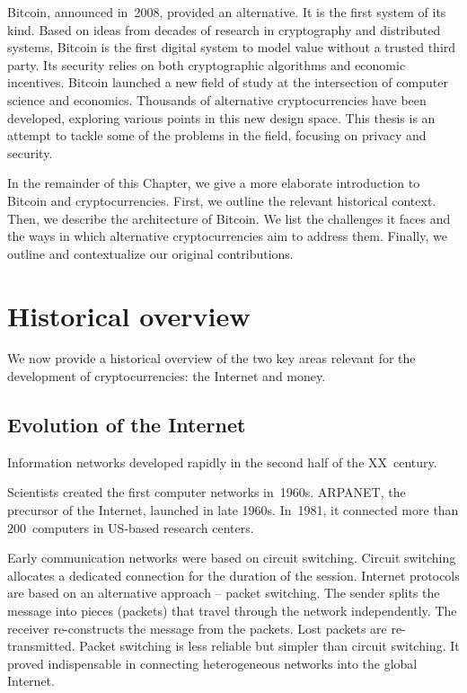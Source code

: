 Bitcoin, announced in~2008, provided an alternative.
It is the first system of its kind.
Based on ideas from decades of research in cryptography and distributed systems, Bitcoin is the first digital system to model value without a trusted third party.
Its security relies on both cryptographic algorithms and economic incentives.
Bitcoin launched a new field of study at the intersection of computer science and economics.
Thousands of alternative cryptocurrencies have been developed, exploring various points in this new design space.
This thesis is an attempt to tackle some of the problems in the field, focusing on privacy and security.

In the remainder of this Chapter, we give a more elaborate introduction to Bitcoin and cryptocurrencies.
First, we outline the relevant historical context.
Then, we describe the architecture of Bitcoin.
We list the challenges it faces and the ways in which alternative cryptocurrencies aim to address them.
Finally, we outline and contextualize our original contributions.


\section{Historical overview}

We now provide a historical overview of the two key areas relevant for the development of cryptocurrencies: the Internet and money.

\subsection{Evolution of the Internet}

Information networks developed rapidly in the second half of the XX~century.

Scientists created the first computer networks in~1960s.
ARPANET, the precursor of the Internet, launched in late 1960s.
In~1981, it connected more than $200$~computers in US-based research centers.

Early communication networks were based on circuit switching.
Circuit switching allocates a dedicated connection for the duration of the session.
Internet protocols are based on an alternative approach -- packet switching.
The sender splits the message into pieces (packets) that travel through the network independently.
The receiver re-constructs the message from the packets.
Lost packets are re-transmitted.
Packet switching is less reliable but simpler than circuit switching.
It proved indispensable in connecting heterogeneous networks into the global Internet.

